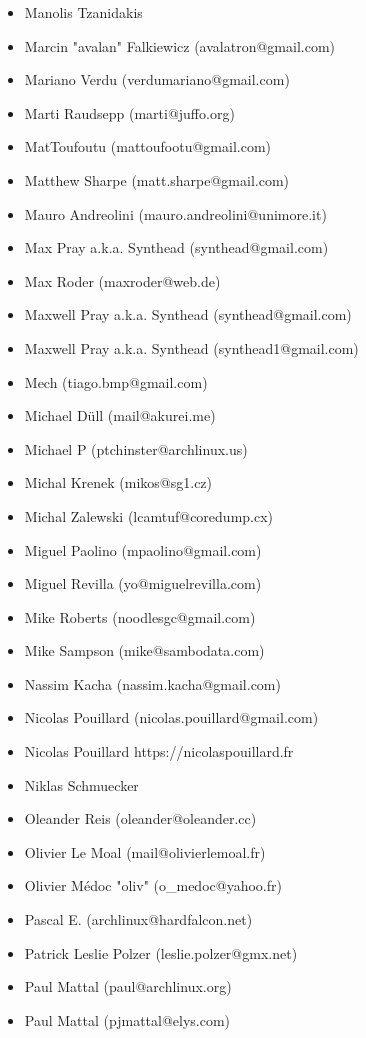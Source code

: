 \begin{latin}
\begin{itemize}
\item  Manolis Tzanidakis
\item  Marcin "avalan" Falkiewicz (avalatron@gmail.com)
\item  Mariano Verdu (verdumariano@gmail.com)
\item  Marti Raudsepp (marti@juffo.org)
\item  MatToufoutu (mattoufootu@gmail.com)
\item  Matthew Sharpe (matt.sharpe@gmail.com)
\item  Mauro Andreolini (mauro.andreolini@unimore.it)
\item  Max Pray a.k.a. Synthead (synthead@gmail.com)
\item  Max Roder (maxroder@web.de)
\item  Maxwell Pray a.k.a. Synthead (synthead@gmail.com)
\item  Maxwell Pray a.k.a. Synthead (synthead1@gmail.com)
\item  Mech (tiago.bmp@gmail.com)
\item  Michael Düll (mail@akurei.me)
\item  Michael P (ptchinster@archlinux.us)
\item  Michal Krenek (mikos@sg1.cz)
\item  Michal Zalewski (lcamtuf@coredump.cx)
\item  Miguel Paolino (mpaolino@gmail.com)
\item  Miguel Revilla (yo@miguelrevilla.com)
\item  Mike Roberts (noodlesgc@gmail.com)
\item  Mike Sampson (mike@sambodata.com)
\item  Nassim Kacha (nassim.kacha@gmail.com)
\item  Nicolas Pouillard (nicolas.pouillard@gmail.com)
\item  Nicolas Pouillard https://nicolaspouillard.fr
\item  Niklas Schmuecker
\item  Oleander Reis (oleander@oleander.cc)
\item  Olivier Le Moal (mail@olivierlemoal.fr)
\item  Olivier Médoc "oliv" (o\_medoc@yahoo.fr)
\item  Pascal E. (archlinux@hardfalcon.net)
\item  Patrick Leslie Polzer (leslie.polzer@gmx.net)
\item  Paul Mattal (paul@archlinux.org)
\item  Paul Mattal (pjmattal@elys.com)

\end{itemize}
\end{latin}
